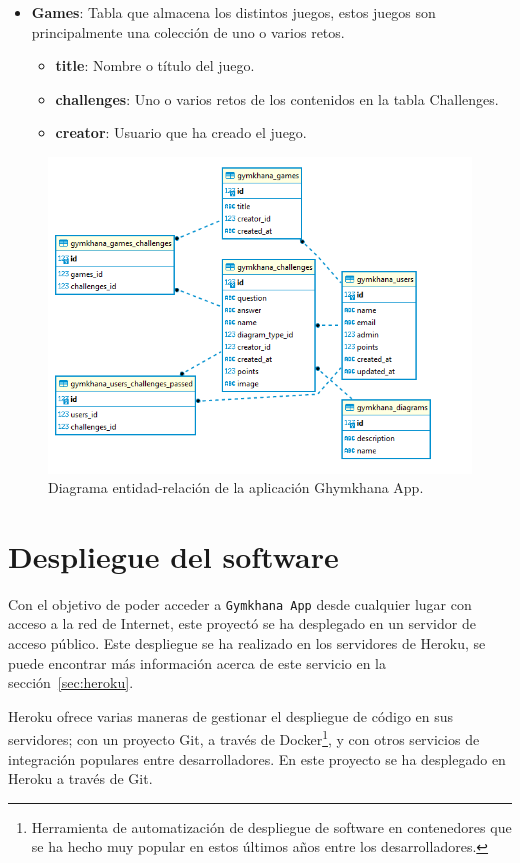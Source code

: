 \documentclass[a4paper, 12pt]{book}
\begin{document}
\begin{itemize}
	\item \textbf {Games}: Tabla que almacena los distintos juegos, estos juegos son principalmente una colección de uno o varios retos. 
	\begin{itemize}
		\item \textbf {title}: Nombre o título del juego. 
		\item \textbf {challenges}: Uno o varios retos de los contenidos en la tabla Challenges. 
		\item \textbf {creator}: Usuario que ha creado el juego. 
	\end{itemize}
	
\end{itemize}

\begin{figure}
	\centering
	\includegraphics[width=16cm, keepaspectratio]{img/gymkhana_ER.png}
	\caption{Diagrama entidad-relación de la aplicación Ghymkhana App.}\label{fig:diagarma_ER}
\end{figure}

\section{Despliegue del software}
Con el objetivo de poder acceder a \texttt{Gymkhana App} desde cualquier lugar con acceso a la red de Internet, este proyectó se ha desplegado en un servidor de acceso público. Este despliegue se ha realizado en los servidores de Heroku, se puede encontrar más información acerca de este servicio en la sección~\ref{sec:heroku}. 

Heroku ofrece varias maneras de gestionar el despliegue de código en sus servidores; con un proyecto Git, a través de Docker\footnote{Herramienta de automatización de despliegue de software en contenedores que se ha hecho muy popular en estos últimos años entre los desarrolladores.}, y con otros servicios de integración populares entre desarrolladores. En este proyecto se ha desplegado en Heroku a través de Git.
\end{document}
